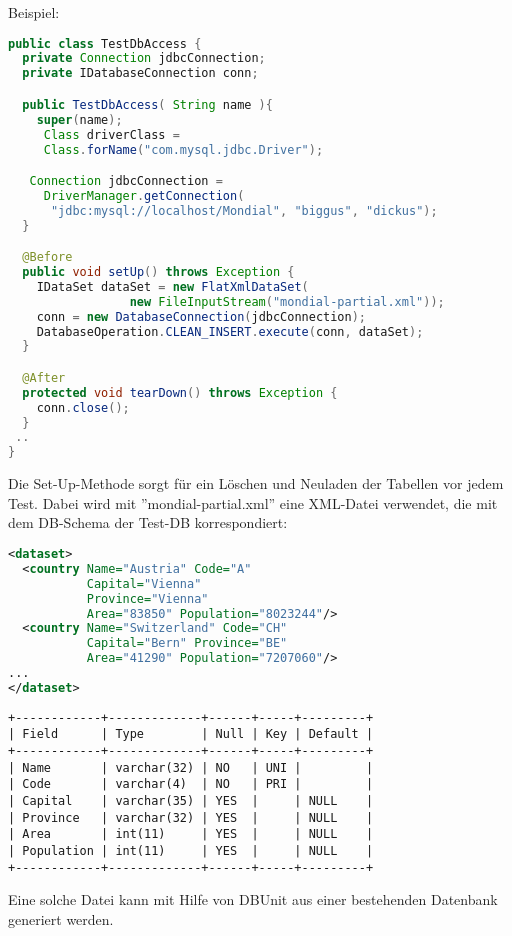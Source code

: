 \newslide
Beispiel:
\begin{lstlisting}[language=java]
public class TestDbAccess {
  private Connection jdbcConnection;
  private IDatabaseConnection conn;

  public TestDbAccess( String name ){
    super(name);
     Class driverClass =
     Class.forName("com.mysql.jdbc.Driver");

   Connection jdbcConnection =
	 DriverManager.getConnection(
	  "jdbc:mysql://localhost/Mondial", "biggus", "dickus");
  }

  @Before
  public void setUp() throws Exception {
    IDataSet dataSet = new FlatXmlDataSet(
                 new FileInputStream("mondial-partial.xml"));
    conn = new DatabaseConnection(jdbcConnection);
    DatabaseOperation.CLEAN_INSERT.execute(conn, dataSet);
  }

  @After
  protected void tearDown() throws Exception {
    conn.close();
  }
 ..
}
\end{lstlisting}
Die Set-Up-Methode sorgt für ein Löschen und Neuladen
der Tabellen vor jedem Test. Dabei wird mit ''mondial-partial.xml''
eine XML-Datei verwendet, die
mit dem DB-Schema der Test-DB korrespondiert:
\begin{lstlisting}[language=xml,morekeywords={dataset}]
<dataset>
  <country Name="Austria" Code="A"
           Capital="Vienna"
           Province="Vienna"
           Area="83850" Population="8023244"/>
  <country Name="Switzerland" Code="CH"
           Capital="Bern" Province="BE"
           Area="41290" Population="7207060"/>
...
</dataset>
\end{lstlisting}
\newslide
\begin{lstlisting}
+------------+-------------+------+-----+---------+
| Field      | Type        | Null | Key | Default |
+------------+-------------+------+-----+---------+
| Name       | varchar(32) | NO   | UNI |         |
| Code       | varchar(4)  | NO   | PRI |         |
| Capital    | varchar(35) | YES  |     | NULL    |
| Province   | varchar(32) | YES  |     | NULL    |
| Area       | int(11)     | YES  |     | NULL    |
| Population | int(11)     | YES  |     | NULL    |
+------------+-------------+------+-----+---------+
\end{lstlisting}
Eine solche Datei kann mit Hilfe von DBUnit aus einer bestehenden
Datenbank generiert werden.

